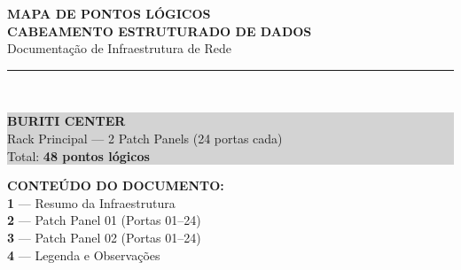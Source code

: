\documentclass[12pt, a4paper]{article}
\begin{document}
\begin{titlepage}
    \centering
    \vspace*{2cm}


    \vspace{1.5cm}
    {\Huge \textbf{\textcolor{primaryColor}{MAPA DE PONTOS LÓGICOS}}} \\
    \vspace{0.4cm}
    {\Large \textbf{CABEAMENTO ESTRUTURADO DE DADOS}} \\
    \vspace{0.3cm}
    {\large Documentação de Infraestrutura de Rede} \\
    \vspace{2cm}
    \rule{12cm}{1.5pt} \\
    \vspace{0.8cm}

    \colorbox{lightGray}{%
        \parbox{0.9\textwidth}{%
            \centering
            \vspace{0.5cm}
            {\Large \textbf{BURITI CENTER}} \\
            \vspace{0.3cm}
            {\large Rack Principal --- 2 Patch Panels (24 portas cada)} \\
            \vspace{0.2cm}
            {\normalsize Total: \textbf{48 pontos lógicos}} \\
            \vspace{0.5cm}
        }%
    }

    \vspace{2cm}

    \begin{flushleft}
    \textbf{CONTEÚDO DO DOCUMENTO:} \\
    \vspace{0.3cm}
    \textcolor{primaryColor}{\textbf{1}} --- Resumo da Infraestrutura \\
    \textcolor{primaryColor}{\textbf{2}} --- Patch Panel 01 (Portas 01--24) \\
    \textcolor{primaryColor}{\textbf{3}} --- Patch Panel 02 (Portas 01--24) \\
    \textcolor{primaryColor}{\textbf{4}} --- Legenda e Observações
    \end{flushleft}


\end{titlepage}
\end{document}
